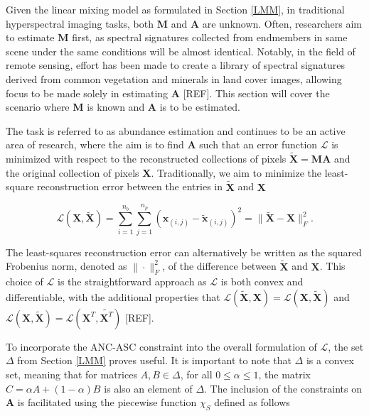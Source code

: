 Given the linear mixing model as formulated in Section \ref{LMM}, in traditional hyperspectral imaging tasks, both $\mathbf{M}$ and $\mathbf{A}$ are unknown. Often, researchers aim to estimate $\mathbf{M}$ first, as spectral signatures collected from endmembers in same scene under the same conditions will be almost identical. Notably, in the field of remote sensing, effort has been made to create a library of spectral signatures derived from common vegetation and minerals in land cover images, allowing focus to be made solely in estimating $\mathbf{A}$ [REF]. This section will cover the scenario where $\mathbf{M}$ is known and $\mathbf{A}$ is to be estimated. 

The task is referred to as abundance estimation and continues to be an active area of research, where the aim is to find $\mathbf{A}$ such that an error function $\mathcal{L}$ is minimized with respect to the reconstructed collections of pixels $\tilde{\mathbf{X}} = \mathbf{MA}$ and the original collection of pixels $\mathbf{X}$. Traditionally, we aim to minimize the least-square reconstruction error between the entries in $\tilde{\mathbf{X}}$ and $\mathbf{X}$

\begin{equation}
    \label{ae:fnorm}
    \mathcal{L}(\mathbf{X},\tilde{\mathbf{X}}) = \sum_{i=1}^{n_b} \sum_{j=1}^{n_p} \left(\mathbf{x}_{(i,j)} - \tilde{\mathbf{x}}_{(i,j)}\right)^2 = \|\tilde{\mathbf{X}} - \mathbf{X}\|_F^2.
\end{equation}

The least-squares reconstruction error can alternatively be written as the squared Frobenius norm, denoted as $\|\cdot\|_F^2$, of the difference between  $\tilde{\mathbf{X}}$ and $\mathbf{X}$. This choice of $\mathcal{L}$ is the straightforward approach as $\mathcal{L}$ is both convex and differentiable, with the additional properties that $\mathcal{L}(\tilde{\mathbf{X}},\mathbf{X}) = \mathcal{L}(\mathbf{X},\tilde{\mathbf{X}})$ and $ \mathcal{L}(\mathbf{X},\tilde{\mathbf{X}}) = \mathcal{L}(\mathbf{X}^T,\tilde{\mathbf{X}^T})$ [REF].

To incorporate the ANC-ASC constraint into the overall formulation of $\mathcal{L}$, the set $\Delta$ from Section \ref{LMM} proves useful. It is important to note that $\Delta$ is a convex set, meaning that for matrices $A, B \in \Delta$, for all $0 \leq \alpha \leq 1$, the matrix $C = \alpha A + (1- \alpha)B$ is also an element of $\Delta$. The inclusion of the constraints on $\mathbf{A}$ is facilitated using the piecewise function $\chi_S$ defined as follows

